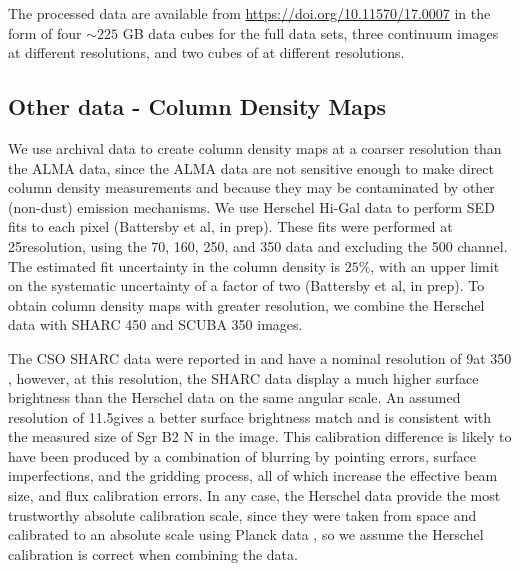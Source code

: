 \documentclass[twocolumn]{aastex61}
\begin{document}
The processed data are available from \url{https://doi.org/10.11570/17.0007} in
the form of four $\sim225$ GB data cubes for the full data sets, three
continuum images at different resolutions, and two cubes of \cyanoacetylene at
different resolutions. 

\subsection{Other data - Column Density Maps}
\label{sec:colmaps}
We use archival data to create column density maps at a coarser
resolution than the ALMA data, since the ALMA data are not sensitive
enough to make direct column density measurements and because they
may be contaminated by other (non-dust) emission mechanisms.   We use Herschel
Hi-Gal data \citep{Molinari2010a} to perform SED fits to each pixel (Battersby
et al, in prep).  These fits were performed at 25\arcsec resolution, using the
70, 160, 250, and 350 \um data and excluding the 500 \um channel.  The
estimated fit uncertainty in the column density is $25\%$, with an upper limit
on the systematic uncertainty of a factor of two (Battersby et al, in prep).
To obtain column density maps with greater resolution, we combine the Herschel
data with SHARC 450 \um and
SCUBA 350 \um images.


The CSO SHARC data were reported in \citet{Bally2010a} and have a nominal
resolution of 9\arcsec at 350 \um, however, at this resolution, the SHARC data
display a much higher surface brightness than the Herschel data on the same
angular scale.  An assumed resolution of 11.5\arcsec gives a better surface
brightness match and is consistent with the measured size of Sgr B2 N in the
image.  This calibration difference is likely to have been produced by a
combination of blurring by pointing errors, surface imperfections, and the
gridding process, all of which increase the effective beam size, and flux
calibration errors.  In any case, the Herschel data provide the most
trustworthy absolute calibration scale, since they were taken from space and
calibrated to an absolute scale using Planck data
\citep{Bendo2013a,Bertincourt2016a}, so we assume the Herschel calibration is
correct when combining the data.
\end{document}
